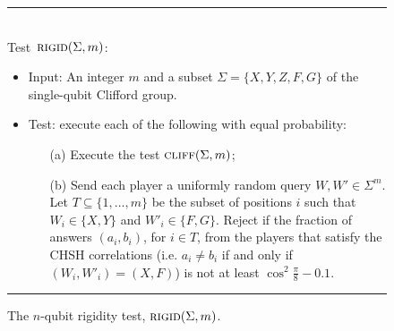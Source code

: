 \begin{figure}[H]
\rule[1ex]{\textwidth}{0.5pt}\\
Test~$\textsc{rigid}(\Sigma,m)$:
\begin{itemize}
    \item Input: An integer $m$ and a subset $\Sigma = \{X,Y,Z,F,G\}$ of the single-qubit Clifford group. 
    \item Test: execute each of the following with equal probability:
\begin{enumerate}
\item[(a)] Execute the test $\textsc{cliff}(\Sigma,m)$;
\item[(b)] Send each player a uniformly random query $W,W'\in \Sigma^m$. Let $T \subseteq \{1,\ldots,m\}$ be the subset of positions $i$ such that $W_i \in \{X,Y\}$ and $W'_i\in\{F,G\}$. Reject if the fraction of answers $(a_i,b_i)$, for $i\in T$, from the players that satisfy the CHSH correlations (i.e. $a_i\neq b_i$ if and only if $(W_i,W'_i)=(X,F)$) is not at least $\cos^2 \frac{\pi}{8} - 0.1$.
\end{enumerate}
\end{itemize}
\rule[2ex]{\textwidth}{0.5pt}\vspace{-.5cm}
\caption{The $n$-qubit rigidity test, $\textsc{rigid}(\Sigma,m)$.}
\label{fig:rigid}
\end{figure}



%

